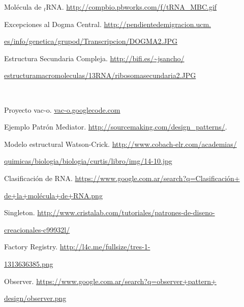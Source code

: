 \documentclass[12pt,a4paper]{report}
\begin{document}
\par [13] Molécula de $_t$RNA. \url{http://compbio.pbworks.com/f/tRNA_MBC.gif} 

\par [14] Excepciones al Dogma Central. \url{http://pendientedemigracion.ucm.}
\par \hspace*{.7cm}\url{es/info/genetica/grupod/Transcripcion/DOGMA2.JPG}

\par [15] Estructura Secundaria Compleja. \url{http://bifi.es/~jsancho/}
\par \hspace*{.7cm}\url{estructuramacromoleculas/13RNA/ribosomasecundaria2.JPG}

\par [16] ~\cite{clus09}

\par [17] Proyecto vac-o. \url{vac-o.googlecode.com} \\

\par [18] Ejemplo Patrón Mediator. \url{http://sourcemaking.com/design_patterns/}.

\par [19] Modelo estructural Watson-Crick. \url{http://www.cobach-elr.com/academias/}
\par \hspace*{.7cm}\url{quimicas/biologia/biologia/curtis/libro/img/14-10.jpg}

\par [20] Clasificación de RNA. \url{https://www.google.com.ar/search?q=Clasificación+}
\par \hspace*{.7cm}\url{de+la+molécula+de+RNA.png}

\par [21] Singleton. \url{http://www.cristalab.com/tutoriales/patrones-de-diseno-}
\par \hspace*{.7cm}\url{creacionales-c99932l/}

\par [22] Factory Registry. \url{http://l4c.me/fullsize/tres-1-}
\par \hspace*{.7cm}\url{1313636385.png}

\par [23] Observer. \url{https://www.google.com.ar/search?q=observer+pattern+}
\par \hspace*{.7cm}\url{design/observer.png}
\end{document}
